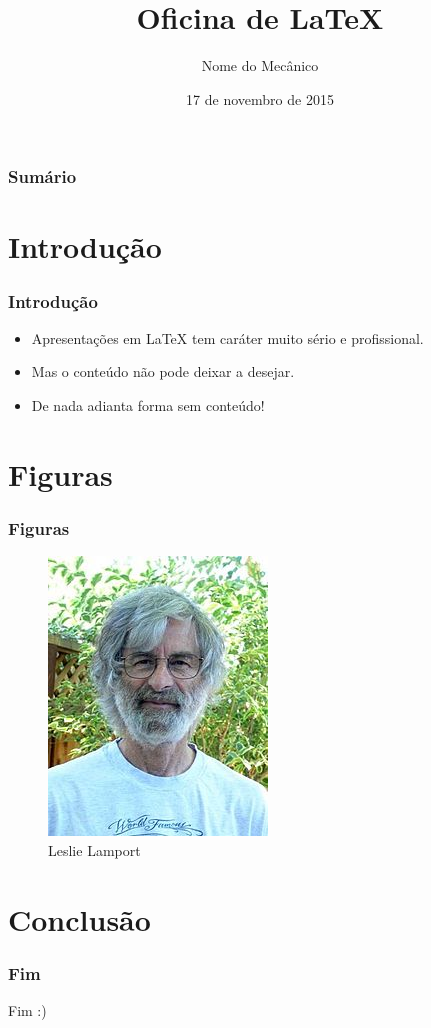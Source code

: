 \documentclass{beamer}
\title{Oficina de \LaTeX}
\author{Nome do Mecânico}
\date{17 de novembro de 2015}
\institute{IFG}
\begin{document}
\maketitle


\begin{frame}
	\frametitle{Sumário}
	\tableofcontents
\end{frame}
\section{Introdução}

\begin{frame}
\frametitle{Introdução}
\begin{itemize}
\item Apresentações em \LaTeX{} tem caráter muito sério e profissional.
\item Mas o conteúdo não pode deixar a desejar.
\item De nada adianta forma sem conteúdo!
\end{itemize}
\end{frame}

\section{Figuras}
\begin{frame}
\frametitle{Figuras}
\begin{figure}[H]
\centering
\includegraphics[scale=.7]{figuras/Lamport}
\caption{Leslie Lamport}
\end{figure}
\end{frame}

\section{Conclusão}
\begin{frame}
\frametitle{Fim}
\begin{center}
\Huge{Fim :)}
\end{center}
\end{frame}
\end{document}
